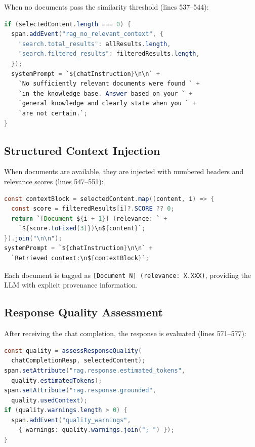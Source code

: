 \documentclass[11pt]{article}
\begin{document}
When no documents pass the similarity threshold (lines 537--544):

\begin{lstlisting}[language=Java,caption={Zero-result fallback --- lines 537--544}]
if (selectedContent.length === 0) {
  span.addEvent("rag_no_relevant_context", {
    "search.total_results": allResults.length,
    "search.filtered_results": filteredResults.length,
  });
  systemPrompt = `${chatInstruction}\n\n` +
    `No sufficiently relevant documents were found ` +
    `in the knowledge base. Answer based on your ` +
    `general knowledge and clearly state when you ` +
    `are not certain.`;
}
\end{lstlisting}

\subsection{Structured Context Injection}

When documents are available, they are injected with numbered headers and
relevance scores (lines 547--551):

\begin{lstlisting}[language=Java,caption={Structured context injection --- lines 547--551}]
const contextBlock = selectedContent.map((content, i) => {
  const score = filteredResults[i]?.SCORE ?? 0;
  return `[Document ${i + 1}] (relevance: ` +
    `${score.toFixed(3)})\n${content}`;
}).join("\n\n");
systemPrompt = `${chatInstruction}\n\n` +
  `Retrieved context:\n${contextBlock}`;
\end{lstlisting}

Each document is tagged as \texttt{[Document N] (relevance: X.XXX)}, providing
the LLM with explicit provenance information.

\subsection{Response Quality Assessment}

After receiving the chat completion, the response is evaluated (lines 571--577):

\begin{lstlisting}[language=Java,caption={Quality assessment --- lines 571--577}]
const quality = assessResponseQuality(
  chatCompletionResp, selectedContent);
span.setAttribute("rag.response.estimated_tokens",
  quality.estimatedTokens);
span.setAttribute("rag.response.grounded",
  quality.usedContext);
if (quality.warnings.length > 0) {
  span.addEvent("quality_warnings",
    { warnings: quality.warnings.join("; ") });
}
\end{lstlisting}
\end{document}
